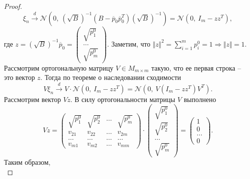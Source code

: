 \begin{proof}
    
    \begin{equation*}
        \xi _{n}\xrightarrow{d}\mathcal{N}\left( 0,\ \left(\sqrt{B}\right)^{-1}\left( B-\overline{p}_{0}\overline{p}_{0}^{T}\right)\left(\sqrt{B}\right)^{-1}\right) =\mathcal{N}\left( 0,\ I_{m} -zz^{T}\right) ,
    \end{equation*}
    где $\displaystyle z=\left(\sqrt{B}\right)^{-1}\overline{p}_{0} =\begin{pmatrix}
    \sqrt{p_{1}^{0}}\\
    \dotsc \\
    \sqrt{p_{m}^{0}}
    \end{pmatrix}$. Заметим, что $\displaystyle \Vert z\Vert ^{2} =\sum _{i=1}^{m} p_{i}^{0} =1\Rightarrow \Vert z\Vert =1$. Рассмотрим ортогональную матрицу $\displaystyle V\in M_{m\times m}$ такую, что ее первая строка -- это вектор $\displaystyle z$. Тогда по теореме о наследовании сходимости
    \begin{equation*}
        V\xi _{n}\xrightarrow{d} V\cdotp \mathcal{N}\left( 0,\ I_{m} -zz^{T}\right) =\mathcal{N}\left( 0,\ V\left( I_{m} -zz^{T}\right) V^{T}\right) .
    \end{equation*}
    Рассмотрим вектор $\displaystyle Vz$. В силу ортогональности матрицы $\displaystyle V$ выполнено
    \begin{equation*}
        Vz=\begin{pmatrix}
        \sqrt{p_{1}^{0}} & \sqrt{p_{2}^{0}} & \dotsc  & \sqrt{p_{m}^{0}}\\
        v_{21} & v_{22} & \dotsc  & v_{2m}\\
        \dotsc  & \dotsc  & \dotsc  & \dotsc \\
        v_{m1} & v_{m2} & \dotsc  & v_{mm}
        \end{pmatrix} \cdotp \begin{pmatrix}
        \sqrt{p_{1}^{0}}\\
        \sqrt{p_{2}^{0}}\\
        \dotsc \\
        \sqrt{p_{m}^{0}}
        \end{pmatrix} =\begin{pmatrix}
        1\\
        0\\
        \dotsc \\
        0
        \end{pmatrix} .
    \end{equation*}
    Таким образом, 
    \begin{equation*}

\end{equation*}
\end{proof}

